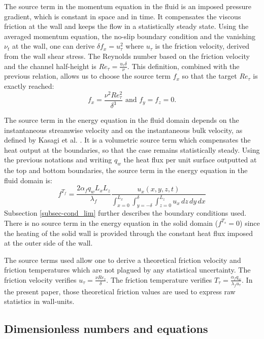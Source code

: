 \documentclass{svjour3}                     %
\begin{document}
The source term in the momentum equation in the fluid is an imposed pressure gradient, which is constant in space and in time.
It compensates the viscous friction at the wall and keeps the flow in a statistically steady state.
Using the averaged momentum equation, the no-slip boundary condition and the vanishing $\nu_t$ at the wall, one can derive ${\delta f_x = u_\tau^2}$ where $u_\tau$ is the friction velocity, derived from the wall shear stress.
The Reynolds number based on the friction velocity and the channel half-height is ${Re_\tau = \frac{u_\tau \delta}{\nu}}$.
This definition, combined with the previous relation, allows us to choose the source term $f_x$ so that the target $Re_\tau$ is exactly reached:
\begin{equation}
f_x = \frac{\nu^2 Re_\tau^2}{\delta^3} \mbox{ and } f_y = f_z = 0\mbox{.}
\end{equation}

The source term in the energy equation in the fluid domain depends on the instantaneous streamwise velocity and on the instantaneous bulk velocity, as defined by Kasagi et al. \cite{kasagi1992direct}.
It is a volumetric source term which compensates the heat output at the boundaries, so that the case remains statistically steady.
Using the previous notations and writing $q_w$ the heat flux per unit surface outputted at the top and bottom boundaries, the source term in the energy equation in the fluid domain is:
\begin{equation}
f^{T_f} = \frac{2 \alpha_f q_w L_x L_z}{\lambda_f} \frac{ u_x (x,y,z,t) } {\int_{x=0}^{L_x} \int_{y=-\delta}^\delta \int_{z=0}^{L_z} u_x \,dz \,dy \,dx}
\end{equation}
Subsection \ref{subsec-cond_lim} further describes the boundary conditions used.
There is no source term in the energy equation in the solid domain ($f^{T_s}=0$) since the heating of the solid wall is provided through the constant heat flux imposed at the outer side of the wall.

The source terms used allow one to derive a theoretical friction velocity and friction temperatures which are not plagued by any statistical uncertainty.
The friction velocity verifies $u_\tau = \frac{\nu Re_\tau}{\delta}$.
The friction temperature verifies $T_\tau = \frac{\alpha_f q_w}{\lambda_f u_\tau}$.
In the present paper, those theoretical friction values are used to express raw statistics in wall-units.

\subsection{Dimensionless numbers and equations}
\label{subsec-dimensionless}
\end{document}
